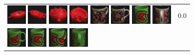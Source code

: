 \begin{figure}[tbp]
\begin{tabular}{m{11cm} | m{3cm} |}
\includegraphics[width=1cm]{coil/beeld-21.eps}
\includegraphics[width=1cm]{coil/beeld-22.eps}
\includegraphics[width=1cm]{coil/beeld-20.eps}
\includegraphics[width=1cm]{coil/beeld-23.eps}
\includegraphics[width=1cm]{coil/beeld-63.eps}
\includegraphics[width=1cm]{coil/beeld-60.eps}
\includegraphics[width=1cm]{coil/beeld-32.eps}
\includegraphics[width=1cm]{coil/beeld-65.eps}
& {\scriptsize 0.0}
\\
\includegraphics[width=1cm]{coil/beeld-30.eps}
\includegraphics[width=1cm]{coil/beeld-32.eps}
\includegraphics[width=1cm]{coil/beeld-33.eps}
\includegraphics[width=1cm]{coil/beeld-35.eps}

\end{tabular}
\end{figure}
